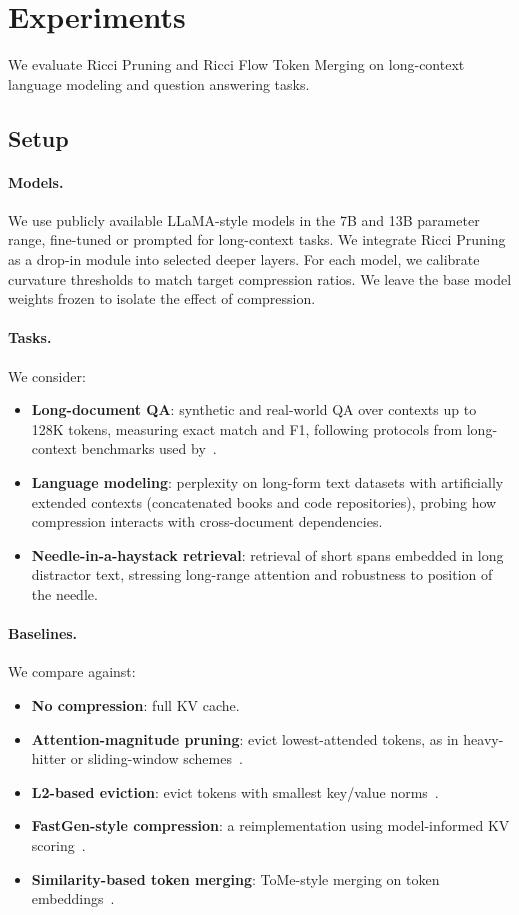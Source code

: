 \documentclass{article}
\theoremstyle{plain}
\theoremstyle{definition}
\theoremstyle{remark}
\begin{document}
\section{Experiments}
\label{sec:experiments}

We evaluate Ricci Pruning and Ricci Flow Token Merging on long-context language modeling and question answering tasks.

\subsection{Setup}

\paragraph{Models.}
We use publicly available LLaMA-style models in the 7B and 13B parameter range, fine-tuned or prompted for long-context tasks. We integrate Ricci Pruning as a drop-in module into selected deeper layers. For each model, we calibrate curvature thresholds to match target compression ratios. We leave the base model weights frozen to isolate the effect of compression.

\paragraph{Tasks.}
We consider:
\begin{itemize}
  \item \textbf{Long-document QA}: synthetic and real-world QA over contexts up to 128K tokens, measuring exact match and F1, following protocols from long-context benchmarks used by~\citet{liu2024lost}.
  \item \textbf{Language modeling}: perplexity on long-form text datasets with artificially extended contexts (concatenated books and code repositories), probing how compression interacts with cross-document dependencies.
  \item \textbf{Needle-in-a-haystack retrieval}: retrieval of short spans embedded in long distractor text, stressing long-range attention and robustness to position of the needle.
\end{itemize}

\paragraph{Baselines.}
We compare against:
\begin{itemize}
  \item \textbf{No compression}: full KV cache.
  \item \textbf{Attention-magnitude pruning}: evict lowest-attended tokens, as in heavy-hitter or sliding-window schemes~\citep{ge2024fastgen,li2024snapkv}.
  \item \textbf{L2-based eviction}: evict tokens with smallest key/value norms~\citep{devoto2024l2kv}.
  \item \textbf{FastGen-style compression}: a reimplementation using model-informed KV scoring~\citep{ge2024fastgen}.
  \item \textbf{Similarity-based token merging}: ToMe-style merging on token embeddings~\citep{bolya2023tome}.
\end{itemize}
\end{document}
